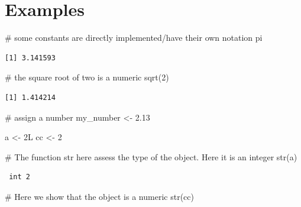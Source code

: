 \documentclass[
  letterpaper,
  DIV=11,
  numbers=noendperiod]{scrreprt}
\newenvironment{Shaded}{\begin{snugshade}}{\end{snugshade}}
\newcommand{\CommentTok}[1]{\textcolor[rgb]{0.37,0.37,0.37}{#1}}
\newcommand{\DecValTok}[1]{\textcolor[rgb]{0.68,0.00,0.00}{#1}}
\newcommand{\FloatTok}[1]{\textcolor[rgb]{0.68,0.00,0.00}{#1}}
\newcommand{\FunctionTok}[1]{\textcolor[rgb]{0.28,0.35,0.67}{#1}}
\newcommand{\NormalTok}[1]{\textcolor[rgb]{0.00,0.23,0.31}{#1}}
\newcommand{\OtherTok}[1]{\textcolor[rgb]{0.00,0.23,0.31}{#1}}
\begin{document}
\section*{Examples}\label{examples-28}


\begin{Shaded}
\begin{Highlighting}[]
\CommentTok{\# some constants are directly implemented/have their own notation}
\NormalTok{pi}
\end{Highlighting}
\end{Shaded}

\begin{verbatim}
[1] 3.141593
\end{verbatim}

\begin{Shaded}
\begin{Highlighting}[]
\CommentTok{\# the square root of two is a numeric}
\FunctionTok{sqrt}\NormalTok{(}\DecValTok{2}\NormalTok{)}
\end{Highlighting}
\end{Shaded}

\begin{verbatim}
[1] 1.414214
\end{verbatim}

\begin{Shaded}
\begin{Highlighting}[]
\CommentTok{\# assign a number}
\NormalTok{my\_number }\OtherTok{\textless{}{-}} \FloatTok{2.13}

\NormalTok{a }\OtherTok{\textless{}{-}} \DecValTok{2}\NormalTok{L}
\NormalTok{cc }\OtherTok{\textless{}{-}} \DecValTok{2}

\CommentTok{\# The function str here assess the type of the object. Here it is an integer}
\FunctionTok{str}\NormalTok{(a)}
\end{Highlighting}
\end{Shaded}

\begin{verbatim}
 int 2
\end{verbatim}

\begin{Shaded}
\begin{Highlighting}[]
\CommentTok{\# Here we show that the object is a numeric}
\FunctionTok{str}\NormalTok{(cc)}
\end{Highlighting}
\end{Shaded}
\end{document}
